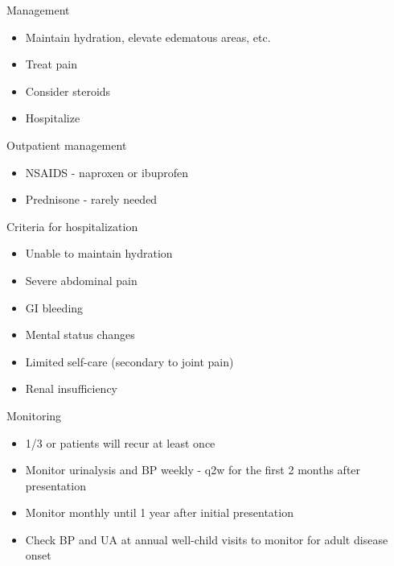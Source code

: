 \begin{frame}{Management}

\begin{itemize}
\itemsep1pt\parskip0pt
\item
  Maintain hydration, elevate edematous areas, etc.
\item
  Treat pain
\item
  Consider steroids
\item
  Hospitalize
\end{itemize}

\end{frame}

\begin{frame}{Outpatient management}

\begin{itemize}
\itemsep1pt\parskip0pt
\item
  NSAIDS - naproxen or ibuprofen
\item
  Prednisone - rarely needed
\end{itemize}

\end{frame}

\begin{frame}{Criteria for hospitalization}

\begin{itemize}
\itemsep1pt\parskip0pt
\item
  Unable to maintain hydration
\item
  Severe abdominal pain
\item
  GI bleeding
\item
  Mental status changes
\item
  Limited self-care (secondary to joint pain)
\item
  Renal insufficiency
\end{itemize}

\end{frame}

\begin{frame}{Monitoring}

\begin{itemize}
\itemsep1pt\parskip0pt
\item
  1/3 or patients will recur at least once
\item
  Monitor urinalysis and BP weekly - q2w for the first 2 months after
  presentation
\item
  Monitor monthly until 1 year after initial presentation
\item
  Check BP and UA at annual well-child visits to monitor for adult
  disease onset
\end{itemize}

\end{frame}

